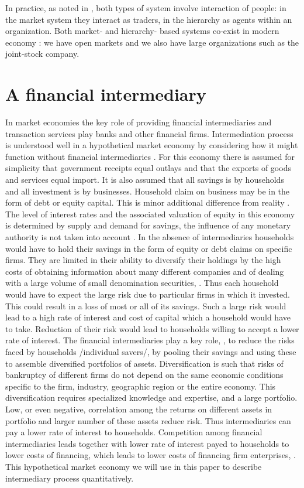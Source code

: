 \documentclass[10pt]{article}
\begin{document}
In practice, as noted in \cite{6}, both types of system involve interaction of people: in the market system they interact  as traders, in the hierarchy as agents within an organization. Both market- and hierarchy- based systems co-exist in modern economy \cite{6}: we have open markets and we also have large organizations such as the joint-stock company.


\section{A financial intermediary}

In market economies the key role of providing financial intermediaries and transaction services play banks and other financial firms. Intermediation process is understood well in a hypothetical market economy by considering how it might function without financial intermediaries \cite{7}. For this economy there is assumed for simplicity that government receipts equal outlays and that the exports of goods and services equal import. It is also assumed that all savings is by households and all investment is by businesses. Household claim on business may be in the form of debt or equity capital. This is minor additional difference from reality \cite{7}. The level of interest rates and the associated valuation of equity in this economy is determined by supply and demand for savings, the influence of any monetary authority is not taken into account \cite{7}. In the absence of intermediaries households would have to hold their savings in the form of equity or debt claims on specific firms.
They are limited in their ability to diversify their holdings by the high costs of obtaining information about many different companies and of dealing with a large volume of small denomination securities, \cite{7}.  Thus each household would have to expect the large risk due to particular firms in which it invested. This could result in  a loss of most or all of its savings. Such a large risk would lead to a high rate of interest and cost of capital which a household would have to take. Reduction of their risk would lead to households willing to accept a lower rate of interest. The financial intermediaries play a key role, \cite{7}, to reduce the risks faced by households /individual savers/, by pooling their savings and using these to assemble diversified portfolios of assets. Diversification is such that risks of bankruptcy of different firms do not depend on the same economic conditions specific to the firm, industry, geographic region or the entire economy. This diversification requires specialized knowledge and expertise, and a large portfolio. Low, or even negative, correlation among the returns on different assets in portfolio and larger number of these assets reduce risk. Thus intermediaries can pay a lower rate of interest to households. Competition among financial intermediaries leads together with lower rate of interest payed to households to lower costs of financing, which leads to lower costs of financing firm enterprises, \cite{7}.
This hypothetical market economy we will use in this paper to describe intermediary process quantitatively.
\end{document}
